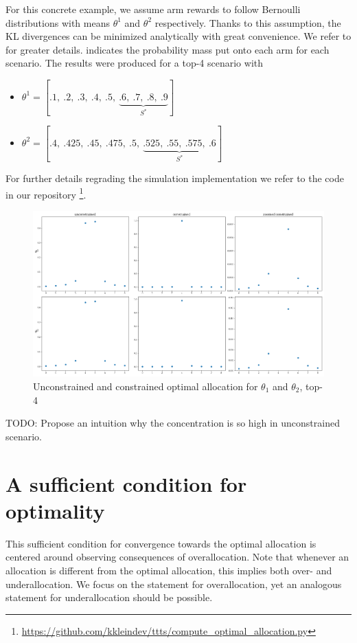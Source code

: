 For this concrete example, we assume arm rewards to follow Bernoulli distributions with means $\theta^1$ and $\theta^2$ respectively. Thanks to this assumption, the KL divergences can be minimized analytically with great convenience. We refer to  for greater details.  indicates the probability mass put onto each arm for each scenario. The results were produced for a top-4 scenario with
\begin{itemize}
  \item $\theta^1 = [.1,\ .2,\ .3,\ .4,\ .5,\ \underbrace{.6,\ .7,\ .8,\ .9}_\text{$S^*$}]$
  \item $\theta^2 = [.4,\ .425,\ .45,\ .475,\ .5,\ \underbrace{.525,\ .55,\ .575,\ .6}_\text{$S^*$}]$
\end{itemize}

For further details regrading the simulation implementation we refer to the code in our repository \footnote{\url{https://github.com/kkleindev/ttts/compute_optimal_allocation.py}}.

\begin{figure}[h]
  \centering
  \includegraphics[width=\textwidth]{optimal_allocation.png}
  \caption{Unconstrained and constrained optimal allocation for $\theta_1$ and $\theta_2$, top-4}
  \label{fig:optimal_allocation}
\end{figure}

TODO: Propose an intuition why the concentration is so high in unconstrained scenario.

\section{A sufficient condition for optimality}\label{section:optimality_sufficient_condition}
This sufficient condition for convergence towards the optimal allocation is centered around observing consequences of overallocation. Note that whenever an allocation is different from the optimal allocation, this implies both over- and underallocation. We focus on the statement for overallocation, yet an analogous statement for underallocation should be possible.

